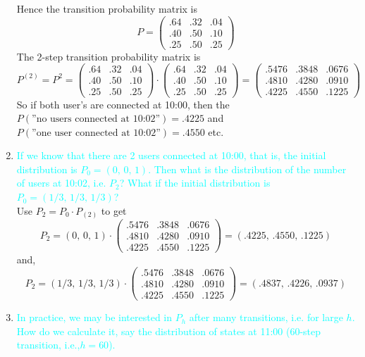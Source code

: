 \documentclass[20pt,landscape]{foils}
\begin{document}
\begin{enumerate}
Hence the transition probability matrix is\\[-.2in]
\[P=\begin{pmatrix}.64 & .32 & .04 \\
.40 & .50 & .10\\
.25 & .50 & .25
\end{pmatrix}\]
The 2-step transition probability matrix is\\[-.2in]
\[P^{(2)}=P^2=
  \begin{pmatrix}.64 & .32 & .04 \\
.40 & .50 & .10\\
.25 & .50 & .25
\end{pmatrix} \cdot 
\begin{pmatrix}.64 & .32 & .04 \\
.40 & .50 & .10\\
.25 & .50 & .25
\end{pmatrix} =
\begin{pmatrix}.5476  & .3848 & .0676 \\
.4810 & .4280 & .0910\\
.4225 & .4550 & .1225
\end{pmatrix}
\]
So if both user's are connected at 10:00, then the $P(\text{''no users connected at 10:02''})=.4225$ and\\ 
$P(\text{''one user connected at 10:02''})=.4550$ etc.\\[-.5in]

\item {\textcolor{cyan}{If we know that there are 2 users connected at 10:00, that is, the
initial distribution is $P_{0}=(0,\,0,\,1)$. Then what is the distribution
of the number of users at 10:02, i.e. $P_{2}$? What if the initial
distribution is $P_{0}=(1/3,\,1/3,\,1/3)$?}}\\
Use $ P_2=P_0 \cdot P_{(2)}$ to get 
$$ P_2= (0,\,0,\,1) \cdot
\begin{pmatrix}.5476  & .3848 & .0676 \\
.4810 & .4280 & .0910\\
.4225 & .4550 & .1225
\end{pmatrix}
= (.4225,\, .4550,\,.1225)$$
and,
$$ P_2= (1/3,\,1/3,\,1/3) \cdot
\begin{pmatrix}.5476  & .3848 & .0676 \\
.4810 & .4280 & .0910\\
.4225 & .4550 & .1225
\end{pmatrix}
= ( .4837,\, .4226,\, .0937)$$
\item {\textcolor{cyan}{In practice, we may be interested in $P_{h}$ after many transitions,
i.e. for large $h$. How do we calculate it, say the distribution
of states at 11:00 (60-step transition, i.e.,$h=60$).}}
\end{enumerate}
\end{document}
